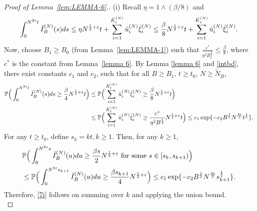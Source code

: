 \documentclass[11pt, reqno]{article}
\numberwithin{equation}{section}
\numberwithin{theorem}{section}
\newcommand\blue[1]{#1}
\begin{document}
\begin{appendix}
\begin{proof}[Proof of Lemma~\ref{lem:LEMMA-6}.]
(i) Recall $\eta=1 \wedge (\beta/8)$ and
    \begin{equation}\label{intbd}
    \int_0^{N^{2\varepsilon}t}\Bar{I}_B^{(N)}(s)ds 
    \leq  \eta N^{\frac{1}{2}+\varepsilon} t+ \sum_{i=1}^{\bar{K}^{(N)}_{t}}\Bar{u}^{(N)}_i\Bar{\xi}^{(N)}_i
    \le \frac{\beta}{8}N^{\frac{1}{2}+\varepsilon}t + \sum_{i=1}^{\bar{K}^{(N)}_{t}}\Bar{u}^{(N)}_i\Bar{\xi}^{(N)}_i.
    \end{equation}
Now, choose $B_1\geq B_0$ (from Lemma~\ref{lem:LEMMA-1}) such that $\frac{c^{*}}{\eta^2 B_1^{\frac{1}{2}}}\leq \frac{\beta}{8}$, where $c^{*}$ is the constant from Lemma~\ref{lemma 6}. 
By Lemma \ref{lemma 6} and \eqref{intbd}, there exist constants $c_1$ and $c_2$, such that for all $B\geq B_1$, $t\geq t_0$, $N\geq \tilde N_B$,
    \begin{align}\label{eq:lem4.7-int-IB}
        \mathbb{P}\Big(\int_0^{N^{2\varepsilon}t}\Bar{I}_B^{(N)}(s)ds \ge \frac{\beta}{4}N^{\frac{1}{2}+\varepsilon}t\Big)&\leq \mathbb{P}\Big(\sum_{i=1}^{\bar{K}^{(N)}_{t}}\Bar{u}^{(N)}_i\Bar{\xi}^{(N)}_i\geq \frac{\beta}{8} N^{\frac{1}{2}+\varepsilon}t\Big)\nonumber\\
        &\leq \mathbb{P}\Big(\sum_{i=1}^{\bar{K}^{(N)}_{t}}\Bar{u}^{(N)}_i\Bar{\xi}^{(N)}_i\geq \frac{c^{*}}{\eta^2B^{\frac{1}{2}}}N^{\frac{1}{2}+\varepsilon}t\Big)
        \leq c_1\exp \{-c_2 B^{\frac{1}{5}}  N^{\frac{4\varepsilon}{5}}t^{\frac{1}{5}}\}.
    \end{align}
    For any $t\geq t_0$, define $s_k=kt,k\geq 1$. Then, for any $k\geq 1$,
    \begin{align*}
        &\mathbb{P}\Big(\int_0^{N^{2\varepsilon}s}\Bar{I}_B^{(N)}(u)du \ge \frac{\beta s}{2}N^{\frac{1}{2}+\varepsilon}\text{ for some }s \in [s_k,s_{k+1})\Big)\\
        &\leq  \mathbb{P}\Big(\int_0^{N^{2\varepsilon}s_{k+1}}\Bar{I}_B^{(N)}(u)du \ge \frac{\beta s_{k+1}}{4}N^{\frac{1}{2}+\varepsilon}\Big) \leq c_1\exp \{-c_2 B^{\frac{1}{5}}  N^{\frac{4\varepsilon}{5}}s_{k+1}^{\frac{1}{5}}\}.
    \end{align*}
    Therefore, \ref{7i} follows on summing over $k$ and applying the union bound.\\


\end{proof}
\end{appendix}
\end{document}
